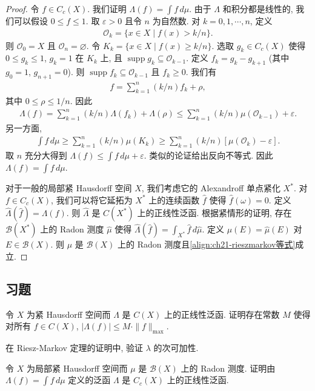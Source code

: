 \documentclass[../../main.tex]{subfiles}
\begin{document}
\begin{proof}
令 $f\in C_{c}(X)$. 我们证明 $\Lambda(f)=\int f\,d\mu$. 由于 $\Lambda$ 和积分都是线性的, 我们可以假设 $0\leqslant f\leqslant 1$. 取 $\varepsilon>0$ 且令 $n$ 为自然数. 对 $k=0,1,\cdots,n$, 定义
\begin{align*}
\mathcal{O}_{k}=\{x\in X\mid f(x)>k/n\}.
\end{align*}
则 $\mathcal{O}_{0}=X$ 且 $\mathcal{O}_{n}=\varnothing$. 令 $K_{k}=\{x\in X\mid f(x)\geqslant k/n\}$. 选取 $g_{k}\in C_{c}(X)$ 使得 $0\leqslant g_{k}\leqslant 1$, $g_{k}=1$ 在 $K_{k}$ 上, 且 $\operatorname{supp}g_{k}\subseteq\mathcal{O}_{k-1}$. 定义 $f_{k}=g_{k}-g_{k+1}$ (其中 $g_{0}=1$, $g_{n+1}=0$). 则 $\operatorname{supp}f_{k}\subseteq\mathcal{O}_{k-1}$ 且 $f_{k}\geqslant 0$. 我们有
\begin{align*}
f=\sum_{k=1}^{n}(k/n)f_{k}+\rho,
\end{align*}
其中 $0\leqslant\rho\leqslant 1/n$. 因此
\begin{align*}
\Lambda(f)=\sum_{k=1}^{n}(k/n)\Lambda(f_{k})+\Lambda(\rho)\leqslant\sum_{k=1}^{n}(k/n)\mu(\mathcal{O}_{k-1})+\varepsilon.
\end{align*}
另一方面,
\begin{align*}
\int f\,d\mu\geqslant\sum_{k=1}^{n}(k/n)\mu(K_{k})\geqslant\sum_{k=1}^{n}(k/n)[\mu(\mathcal{O}_{k})-\varepsilon].
\end{align*}
取 $n$ 充分大得到 $\Lambda(f)\leqslant\int f\,d\mu+\varepsilon$. 类似的论证给出反向不等式. 因此 $\Lambda(f)=\int f\,d\mu$.

对于一般的局部紧 Hausdorff 空间 $X$, 我们考虑它的 Alexandroff 单点紧化 $X^{*}$. 对 $f\in C_{c}(X)$, 我们可以将它延拓为 $X^{*}$ 上的连续函数 $\widehat{f}$ 使得 $\widehat{f}(\omega)=0$. 定义 $\widehat{\Lambda}(\widehat{f})=\Lambda(f)$. 则 $\widehat{\Lambda}$ 是 $C(X^{*})$ 上的正线性泛函. 根据紧情形的证明, 存在 $\mathcal{B}(X^{*})$ 上的 Radon 测度 $\widehat{\mu}$ 使得 $\widehat{\Lambda}(\widehat{f})=\int_{X^{*}}\widehat{f}\,d\widehat{\mu}$. 定义 $\mu(E)=\widehat{\mu}(E)$ 对 $E\in\mathcal{B}(X)$. 则 $\mu$ 是 $\mathcal{B}(X)$ 上的 Radon 测度且\eqref{align:ch21-rieszmarkov等式}成立.
\end{proof}

\subsection*{习题}

\begin{exercise}\label{exercise:ch21-28}
令 $X$ 为紧 Hausdorff 空间而 $\Lambda$ 是 $C(X)$ 上的正线性泛函. 证明存在常数 $M$ 使得对所有 $f\in C(X)$, $|\Lambda(f)|\leqslant M\cdot\|f\|_{\max}$.
\end{exercise}

\begin{exercise}\label{exercise:ch21-29}
在 Riesz-Markov 定理的证明中, 验证 $\lambda$ 的次可加性.
\end{exercise}

\begin{exercise}\label{exercise:ch21-30}
令 $X$ 为局部紧 Hausdorff 空间而 $\mu$ 是 $\mathcal{B}(X)$ 上的 Radon 测度. 证明由 $\Lambda(f)=\int f\,d\mu$ 定义的泛函 $\Lambda$ 是 $C_{c}(X)$ 上的正线性泛函.
\end{exercise}
\end{document}
